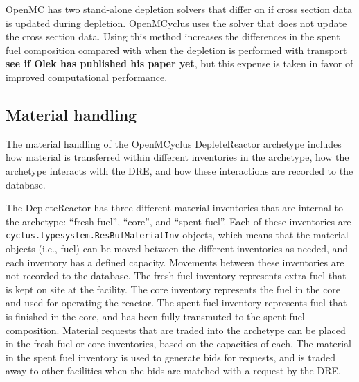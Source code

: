 OpenMC has two stand-alone depletion solvers that differ on if cross section 
data is updated during depletion. OpenMCyclus uses the solver that does 
not update the cross section data. Using this method increases 
the differences in the spent fuel composition compared with when the depletion 
is performed with transport \textbf{see if Olek has published his paper yet},
but this expense is taken in favor of improved computational performance.

\subsection{Material handling}
The material handling of the OpenMCyclus DepleteReactor archetype 
includes how material is transferred within different inventories 
in the archetype, how the archetype interacts with the \gls{DRE}, 
and how these interactions are recorded to the database. 

The DepleteReactor has three different material inventories that 
are internal to the archetype: ``fresh fuel'', ``core'', and ``spent 
fuel''. Each of these inventories are 
\texttt{cyclus.typesystem.ResBufMaterialInv} objects, which means that 
the material objects (i.e., fuel) can be moved between the different 
inventories as needed, and each inventory has a defined capacity. Movements 
between these inventories are not recorded to the database. The fresh 
fuel inventory represents extra fuel that is kept on site at the 
facility. The core inventory represents the fuel in the core 
and used for operating the reactor. The spent fuel inventory 
represents fuel that is finished in the core, and has been fully 
transmuted to the spent fuel composition. Material requests that 
are traded into the archetype can be placed in the fresh fuel 
or core inventories, based on the capacities of each. The 
material in the spent fuel inventory is used to generate bids 
for requests, and is traded away to other facilities when the bids 
are matched with a request by the \gls{DRE}. 

